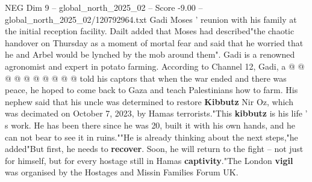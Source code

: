 \begin{textsample}{NEG Dim 9 – global\_north\_2025\_02 – Score -9.00 – global\_north\_2025\_02/120792964.txt}
Gadi Moses ' reunion with his family at the initial reception facility.
Dailt added that Moses had described"the chaotic handover on Thursday as a moment of mortal fear and said that he worried that he and Arbel would be lynched by the mob around them".
Gadi is a renowned agronomist and expert in potato farming.
According to Channel 12, Gadi, a @ @ @ @ @ @ @ @ @ @ told his captors that when the war ended and there was peace, he hoped to come back to Gaza and teach Palestinians how to farm.
His nephew said that his uncle was determined to restore \textbf{Kibbutz} Nir Oz, which was decimated on October 7, 2023, by Hamas terrorists."This \textbf{kibbutz} is his life ' s work.
He has been there since he was 20, built it with his own hands, and he can not bear to see it in ruins.""He is already thinking about the next steps,"he added"But first, he needs to \textbf{recover}.
Soon, he will return to the fight -- not just for himself, but for every hostage still in Hamas \textbf{captivity}."The London \textbf{vigil} was organised by the Hostages and Missin Families Forum UK.

\end{textsample}
